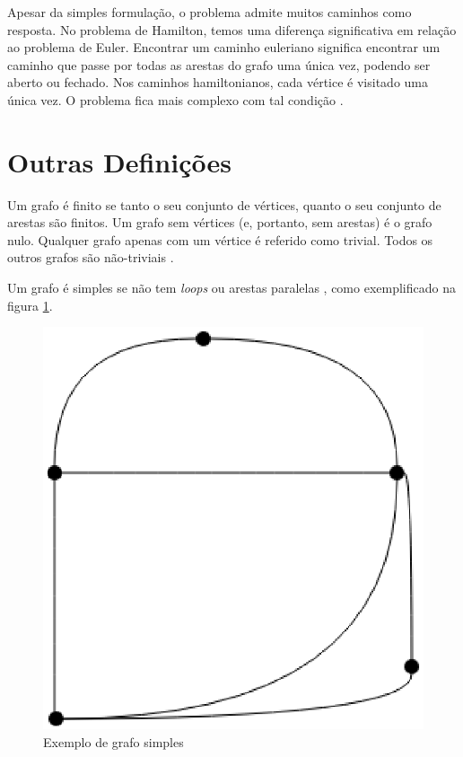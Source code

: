 \begin{apendicesenv}
Apesar da simples formulação, o problema admite muitos caminhos como resposta. No problema de Hamilton, temos uma diferença significativa em relação ao problema de Euler. Encontrar um caminho euleriano significa encontrar um caminho que passe por todas as arestas do grafo uma única vez, podendo ser aberto ou fechado. Nos caminhos hamiltonianos, cada vértice é visitado uma única vez. O problema fica mais complexo com tal condição \cite{Costa:2011}.

\section{Outras Definições}

Um grafo é finito se tanto o seu conjunto de vértices, quanto o seu conjunto de arestas são finitos. Um grafo sem vértices (e, portanto, sem arestas) é o grafo nulo. Qualquer grafo apenas com um vértice é referido como trivial. Todos os outros grafos são não-triviais \cite{Costa:2011}.

Um grafo é simples se não tem \textit{loops} ou arestas paralelas \cite{Diestel:1997}, como exemplificado na figura \ref{grafo_simples}.

\begin{figure}[!h]
	\centering
	\includegraphics[scale=0.2]{figuras/referencial_teorico/grafo_simples.eps}
	\caption[Exemplo de grafo simples]{Exemplo de grafo simples \cite{Costa:2011}}
	\label{grafo_simples}
\end{figure}


\end{apendicesenv}
